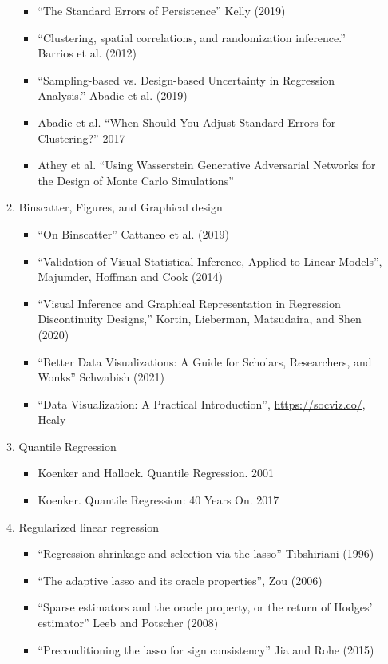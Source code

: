 \documentclass[11pt, a4paper]{article}
\begin{document}
\begin{enumerate}
\begin{enumerate}
\begin{itemize}
    \item ``The Standard Errors of Persistence'' Kelly (2019)
    \item ``Clustering, spatial correlations, and randomization inference.'' Barrios et al. (2012)
    \item  ``Sampling-based vs. Design-based Uncertainty in Regression Analysis.'' Abadie et al. (2019)
    \item Abadie et al. ``When Should You Adjust Standard Errors for Clustering?'' 2017
    \item Athey et al. ``Using Wasserstein Generative Adversarial Networks for the Design of Monte Carlo Simulations''
    \end{itemize}
  \item Binscatter, Figures, and Graphical design 
    \begin{itemize}
    \item ``On Binscatter'' Cattaneo et al. (2019)
    \item ``Validation of Visual Statistical Inference, Applied to Linear Models'', Majumder, Hoffman and Cook (2014)
    \item ``Visual Inference and Graphical Representation in Regression Discontinuity Designs,'' Kortin, Lieberman, Matsudaira, and Shen (2020)
    \item ``Better Data Visualizations: A Guide for Scholars, Researchers, and Wonks'' Schwabish (2021)
    \item ``Data Visualization: A Practical Introduction'', \url{https://socviz.co/}, Healy
    \end{itemize}
  \item Quantile Regression
    \begin{itemize}
    \item Koenker and Hallock. Quantile Regression. 2001
    \item Koenker. Quantile Regression: 40 Years On. 2017
    \end{itemize}
  \item Regularized linear regression
    \begin{itemize}
    \item ``Regression shrinkage and selection via the lasso'' Tibshiriani (1996)
    \item ``The adaptive lasso and its oracle properties'', Zou (2006)
    \item ``Sparse estimators and the oracle property, or the return of Hodges' estimator'' Leeb and Potscher (2008)
    \item ``Preconditioning the lasso for sign consistency'' Jia and Rohe (2015)

\end{itemize}
\end{enumerate}
\end{enumerate}
\end{document}

